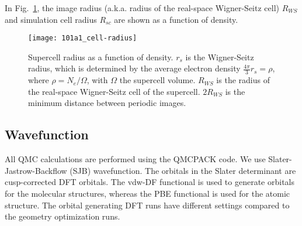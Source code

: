In Fig.~\ref{fig:cell-radius}, the image radius (a.k.a. radius of the real-space Wigner-Seitz cell) $R_{WS}$ and simulation cell radius $R_{sc}$ are shown as a function of density.

\begin{figure}[h]
\texttt{[image: 101a1\_cell-radius]}
\caption{Supercell radius as a function of density. $r_s$ is the Wigner-Seitz radius, which is determined by the average electron density $\frac{4\pi}{3}r_s=\rho$, where $\rho=N_e/\Omega$, with $\Omega$ the supercell volume. $R_{WS}$ is the radius of the real-space Wigner-Seitz cell of the supercell. $2R_{WS}$ is the minimum distance between periodic images. \label{fig:cell-radius}}
\end{figure}

\subsection{Wavefunction}

All QMC calculations are performed using the QMCPACK code. We use Slater-Jastrow-Backflow (SJB) wavefunction. The orbitals in the Slater determinant are cusp-corrected DFT orbitals. The vdw-DF functional is used to generate orbitals for the molecular structures, whereas the PBE functional is used for the atomic structure. The orbital generating DFT runs have different settings compared to the geometry optimization runs.


